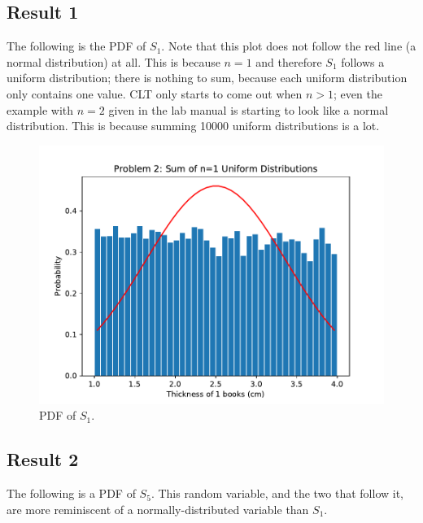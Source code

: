 \documentclass{article}
\begin{document}
\subsection{Result 1} The following is the PDF of \(S_1\).
Note that this plot does not follow the red line (a normal
distribution) at all. This is because \(n = 1\) and therefore
\(S_1\) follows a uniform distribution; there is nothing to
sum, because each uniform distribution only contains one value.
CLT only starts to
come out when \(n > 1\); even the example with \(n = 2\)
given in the lab manual is starting to look like a
normal distribution. This is because summing \num{10000}
uniform distributions is a lot.

\begin{figure}[H]
    \centering
    \includegraphics[width=\textwidth]{Images/Figure4}
    \caption{PDF of \(S_1\).}
    \label{P2:S1}
\end{figure}

\subsection{Result 2} The following is a PDF of \(S_5\).
This random variable, and the two that follow it, are more
reminiscent of a normally-distributed variable than \(S_1\).
\end{document}
